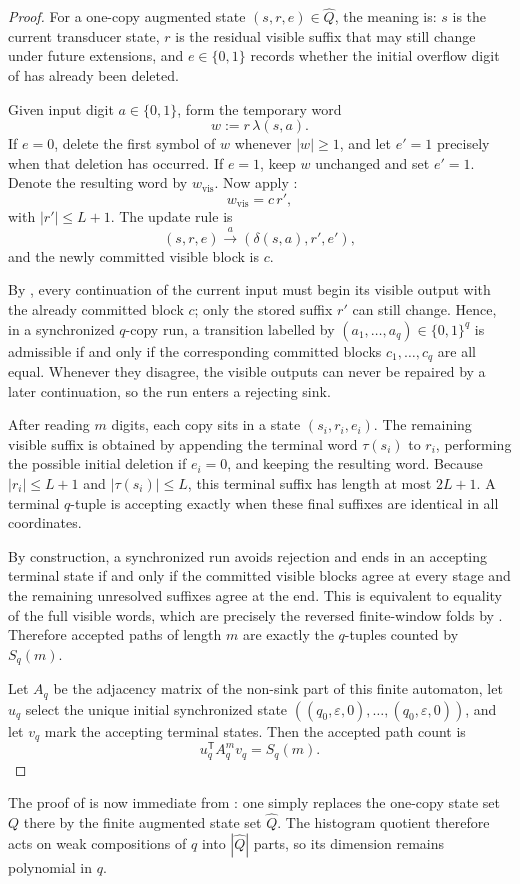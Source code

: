 \begin{proof}
For a one-copy augmented state \((s,r,e)\in\widehat Q\), the meaning is:
\(s\) is the current transducer state, \(r\) is the residual visible suffix
that may still change under future extensions, and \(e\in\{0,1\}\) records
whether the initial overflow digit of  has
already been deleted.

Given input digit \(a\in\{0,1\}\), form the temporary word
\[
  w:=r\,\lambda(s,a).
\]
If \(e=0\), delete the first symbol of \(w\) whenever \(|w|\ge 1\), and let
\(e'=1\) precisely when that deletion has occurred.  If \(e=1\), keep \(w\)
unchanged and set \(e'=1\).  Denote the resulting word by \(w_{\mathrm{vis}}\).
Now apply :
\[
  w_{\mathrm{vis}}
  =
  c\,r',
\]
with \(|r'|\le L+1\).  The update rule is
\[
  (s,r,e)\xrightarrow{\,a\,}(\delta(s,a),r',e'),
\]
and the newly committed visible block is \(c\).

By , every continuation of the current input
must begin its visible output with the already committed block \(c\); only the
stored suffix \(r'\) can still change.  Hence, in a synchronized \(q\)-copy
run, a transition labelled by \((a_1,\dots,a_q)\in\{0,1\}^q\) is admissible if
and only if the corresponding committed blocks \(c_1,\dots,c_q\) are all equal.
Whenever they disagree, the visible outputs can never be repaired by a later
continuation, so the run enters a rejecting sink.

After reading \(m\) digits, each copy sits in a state \((s_i,r_i,e_i)\).  The
remaining visible suffix is obtained by appending the terminal word \(\tau(s_i)\)
to \(r_i\), performing the possible initial deletion if \(e_i=0\), and keeping
the resulting word.  Because \(|r_i|\le L+1\) and \(|\tau(s_i)|\le L\), this
terminal suffix has length at most \(2L+1\).  A terminal \(q\)-tuple is
accepting exactly when these final suffixes are identical in all coordinates.

By construction, a synchronized run avoids rejection and ends in an accepting
terminal state if and only if the committed visible blocks agree at every stage
and the remaining unresolved suffixes agree at the end.  This is equivalent to
equality of the full visible words, which are precisely the reversed
finite-window folds by .  Therefore accepted
paths of length \(m\) are exactly the \(q\)-tuples counted by \(S_q(m)\).

Let \(A_q\) be the adjacency matrix of the non-sink part of this finite
automaton, let \(u_q\) select the unique initial synchronized state
\(((q_0,\varepsilon,0),\dots,(q_0,\varepsilon,0))\), and let \(v_q\) mark the
accepting terminal states.  Then the accepted path count is
\[
  u_q^{\mathsf T}A_q^m v_q=S_q(m).
\]
\end{proof}

The proof of  is now immediate from
: one simply replaces the one-copy state
set \(Q\) there by the finite augmented state set \(\widehat Q\).  The histogram
quotient therefore acts on weak compositions of \(q\) into \(|\widehat Q|\)
parts, so its dimension remains polynomial in \(q\).
